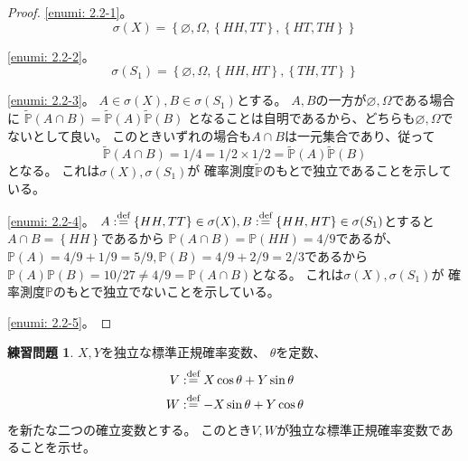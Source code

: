\documentclass[uplatex]{jsarticle}
\theoremstyle{definition}
\newtheorem{prob}[prob]{練習問題}
\renewcommand{\emptyset}{\varnothing}
\def\P{\mathbb{P}}
\def\dfn{:\overset{\mbox{{\scriptsize def}}}{=}}
\begin{document}
\begin{proof}
  \ref{enumi: 2.2-1}。
  \[
  \sigma (X)
  = \left\{ \emptyset, \Omega, \left\{ HH,TT\right\},
  \left\{ HT,TH\right\} \right\}
  \]

  \ref{enumi: 2.2-2}。
  \[
  \sigma (S_1)
  = \left\{ \emptyset, \Omega, \left\{ HH,HT\right\},
  \left\{ TH,TT\right\} \right\}
  \]

  \ref{enumi: 2.2-3}。
  \(A\in \sigma(X), B\in\sigma(S_1)\)とする。
  \(A,B\)の一方が\(\emptyset,\Omega\)である場合に
  \(\tilde{\P}(A\cap B) = \tilde{\P}(A)\tilde{\P}(B)\)
  となることは自明であるから、どちらも\(\emptyset,\Omega\)でないとして良い。
  このときいずれの場合も\(A\cap B\)は一元集合であり、従って
  \[
  \tilde{\P}(A\cap B) = 1/4 = 1/2 \times 1/2 = \tilde{\P}(A)\tilde{\P}(B)
  \]
  となる。
  これは\(\sigma(X),\sigma(S_1)\)が
  確率測度\(\tilde{\P}\)のもとで独立であることを示している。

  \ref{enumi: 2.2-4}。
  \(A\dfn \left\{ HH,TT\right\}\in \sigma(X) ,
  B\dfn \left\{ HH,HT\right\}\in \sigma(S_1)\)とすると
  \(A\cap B = \left\{ HH\right\}\)であるから
  \(\P(A\cap B) = \P(HH) = 4/9\)であるが、
  \(\P(A) = 4/9 + 1/9 = 5/9, \P(B) = 4/9 + 2/9 = 2/3\)であるから
  \(\P(A)\P(B) = 10/27 \neq 4/9 = \P(A\cap B)\)となる。
  これは\(\sigma(X),\sigma(S_1)\)が
  確率測度\(\P\)のもとで独立でないことを示している。

  \ref{enumi: 2.2-5}。

\end{proof}




\begin{prob}\label{prob: 2.3}
  \(X,Y\)を独立な標準正規確率変数、
  \(\theta\)を定数、
  \begin{align*}
    V &\dfn X\cos \theta + Y\sin \theta \\
    W &\dfn -X\sin \theta + Y\cos \theta
  \end{align*}
  を新たな二つの確立変数とする。
  このとき\(V,W\)が独立な標準正規確率変数であることを示せ。
\end{prob}
\end{document}
